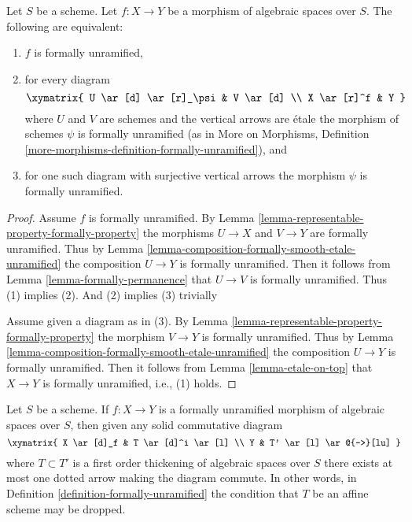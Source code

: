\begin{lemma}
\label{lemma-formally-unramified}
Let $S$ be a scheme. Let $f : X \to Y$ be a morphism of algebraic spaces over
$S$. The following are equivalent:
\begin{enumerate}
\item $f$ is formally unramified,
\item for every diagram
$$
\xymatrix{
U \ar[d] \ar[r]_\psi & V \ar[d] \\
X \ar[r]^f & Y
}
$$
where $U$ and $V$ are schemes and the vertical arrows are \'etale
the morphism of schemes $\psi$ is formally unramified (as in
More on Morphisms,
Definition \ref{more-morphisms-definition-formally-unramified}), and
\item for one such diagram with surjective vertical arrows the morphism
$\psi$ is formally unramified.
\end{enumerate}
\end{lemma}

\begin{proof}
Assume $f$ is formally unramified. By
Lemma \ref{lemma-representable-property-formally-property}
the morphisms $U \to X$ and $V \to Y$ are formally unramified. Thus by
Lemma \ref{lemma-composition-formally-smooth-etale-unramified}
the composition $U \to Y$ is formally unramified. Then it follows from
Lemma \ref{lemma-formally-permanence}
that $U \to V$ is formally unramified. Thus (1) implies (2). And (2)
implies (3) trivially

\medskip\noindent
Assume given a diagram as in (3). By
Lemma \ref{lemma-representable-property-formally-property}
the morphism $V \to Y$ is formally unramified. Thus by
Lemma \ref{lemma-composition-formally-smooth-etale-unramified}
the composition $U \to Y$ is formally unramified. Then it follows from
Lemma \ref{lemma-etale-on-top}
that $X \to Y$ is formally unramified, i.e., (1) holds.
\end{proof}

\begin{lemma}
\label{lemma-formally-unramified-not-affine}
Let $S$ be a scheme.
If $f : X \to Y$ is a formally unramified morphism of algebraic spaces
over $S$, then given any solid commutative diagram
$$
\xymatrix{
X \ar[d]_f & T \ar[d]^i \ar[l] \\
Y & T' \ar[l] \ar@{-->}[lu]
}
$$
where $T \subset T'$ is a first order thickening of algebraic spaces
over $S$ there exists at most one dotted arrow making the diagram commute.
In other words, in
Definition \ref{definition-formally-unramified}
the condition that $T$ be an affine scheme may be dropped.
\end{lemma}

